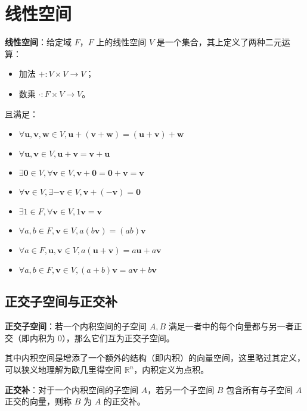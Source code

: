 \section{线性空间}

\begin{tcolorbox}
    \textbf{线性空间}：给定域 $F$，$F$ 上的线性空间 $V$ 是一个集合，其上定义了两种二元运算：
    \begin{itemize}
        \item 加法 $+: V\times V\to V$；
        \item 数乘 $\cdot: F\times V\to V$。
    \end{itemize}
    且满足：
    \begin{multicols}{2}
        \begin{itemize}
            \item $\forall \mathbf{u},\mathbf{v},\mathbf{w}\in V,\mathbf{u}+(\mathbf{v}+\mathbf{w})=(\mathbf{u}+\mathbf{v})+\mathbf{w}$
            \item $\forall \mathbf{u},\mathbf{v}\in V,\mathbf{u}+\mathbf{v}=\mathbf{v}+\mathbf{u}$
            \item $\exists \mathbf{0}\in V,\forall \mathbf{v}\in V,\mathbf{v}+\mathbf{0}=\mathbf{0}+\mathbf{v}=\mathbf{v}$
            \item $\forall \mathbf{v}\in V,\exists -\mathbf{v}\in V,\mathbf{v}+(-\mathbf{v})=\mathbf{0}$
            \item $\exists 1\in F,\forall \mathbf{v}\in V,1\mathbf{v}=\mathbf{v}$
            \item $\forall a,b\in F,\mathbf{v}\in V,a(b\mathbf{v})=(ab)\mathbf{v}$
            \item $\forall a\in F,\mathbf{u},\mathbf{v}\in V,a(\mathbf{u}+\mathbf{v})=a\mathbf{u}+a\mathbf{v}$
            \item $\forall a,b\in F,\mathbf{v}\in V,(a+b)\mathbf{v}=a\mathbf{v}+b\mathbf{v}$
        \end{itemize}
    \end{multicols}
\end{tcolorbox}

\subsection{正交子空间与正交补}

\begin{tcolorbox}
    \textbf{正交子空间}：若一个内积空间的子空间 $A,B$ 满足一者中的每个向量都与另一者正交（即内积为 $0$），那么它们互为正交子空间。
\end{tcolorbox}

其中内积空间是增添了一个额外的结构（即内积）的向量空间，这里略过其定义，可以狭义地理解为欧几里得空间 $\mathbb{R}^n$，内积定义为点积。

\begin{tcolorbox}
    \textbf{正交补}：对于一个内积空间的子空间 $A$，若另一个子空间 $B$ 包含所有与子空间 $A$ 正交的向量，则称 $B$ 为 $A$ 的正交补。
\end{tcolorbox}